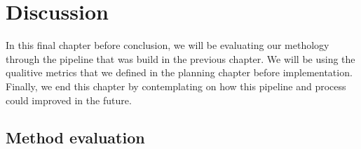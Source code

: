 \chapter{Discussion}
\label{chapter:evaluation}





In this final chapter before conclusion, we will be evaluating our methology through the pipeline that was build in the previous chapter.
We will be using the qualitive metrics that we defined in the planning chapter before implementation.
Finally, we end this chapter by contemplating on how this pipeline and process could improved in the future.

\section{Method evaluation}


